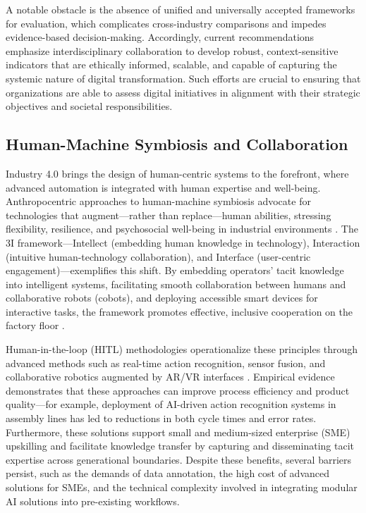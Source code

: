 \documentclass[sigconf]{acmart}
\begin{document}
A notable obstacle is the absence of unified and universally accepted frameworks for evaluation, which complicates cross-industry comparisons and impedes evidence-based decision-making. Accordingly, current recommendations emphasize interdisciplinary collaboration to develop robust, context-sensitive indicators that are ethically informed, scalable, and capable of capturing the systemic nature of digital transformation. Such efforts are crucial to ensuring that organizations are able to assess digital initiatives in alignment with their strategic objectives and societal responsibilities.

\subsection{Human-Machine Symbiosis and Collaboration}

Industry 4.0 brings the design of human-centric systems to the forefront, where advanced automation is integrated with human expertise and well-being. Anthropocentric approaches to human-machine symbiosis advocate for technologies that augment—rather than replace—human abilities, stressing flexibility, resilience, and psychosocial well-being in industrial environments \cite{ref90}. The 3I framework—Intellect (embedding human knowledge in technology), Interaction (intuitive human-technology collaboration), and Interface (user-centric engagement)—exemplifies this shift. By embedding operators’ tacit knowledge into intelligent systems, facilitating smooth collaboration between humans and collaborative robots (cobots), and deploying accessible smart devices for interactive tasks, the framework promotes effective, inclusive cooperation on the factory floor \cite{ref90}.

Human-in-the-loop (HITL) methodologies operationalize these principles through advanced methods such as real-time action recognition, sensor fusion, and collaborative robotics augmented by AR/VR interfaces \cite{ref17,ref27,ref29,ref37,ref38,ref42,ref43,ref45,ref46,ref54,ref89}. Empirical evidence demonstrates that these approaches can improve process efficiency and product quality—for example, deployment of AI-driven action recognition systems in assembly lines has led to reductions in both cycle times and error rates. Furthermore, these solutions support small and medium-sized enterprise (SME) upskilling and facilitate knowledge transfer by capturing and disseminating tacit expertise across generational boundaries. Despite these benefits, several barriers persist, such as the demands of data annotation, the high cost of advanced solutions for SMEs, and the technical complexity involved in integrating modular AI solutions into pre-existing workflows.
\end{document}
